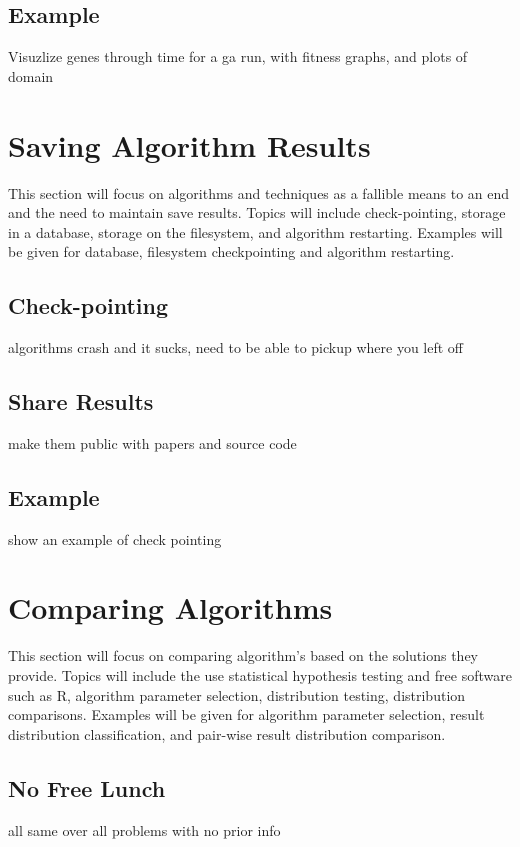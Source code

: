 \subsection{Example}
Visuzlize genes through time for a ga run, with fitness graphs, and plots of domain


% 
% 
\section{Saving Algorithm Results}
\label{advanced:sec:saving}
This section will focus on algorithms and techniques as a fallible means to an end and the need to maintain save results. Topics will include check-pointing, storage in a database, storage on the filesystem, and algorithm restarting. Examples will be given for database, filesystem checkpointing and algorithm restarting.

\subsection{Check-pointing}
algorithms crash and it sucks, need to be able to pickup where you left off

\subsection{Share Results}
make them public with papers and source code

\subsection{Example}
show an example of check pointing

% 
% 
\section{Comparing Algorithms}
\label{advanced:sec:comparing}
This section will focus on comparing algorithm's based on the solutions they provide. Topics will include the use statistical hypothesis testing and free software such as R, algorithm parameter selection, distribution testing, distribution comparisons. Examples will be given for algorithm parameter selection, result distribution classification, and pair-wise result distribution comparison.

\subsection{No Free Lunch}
all same over all problems with no prior info


